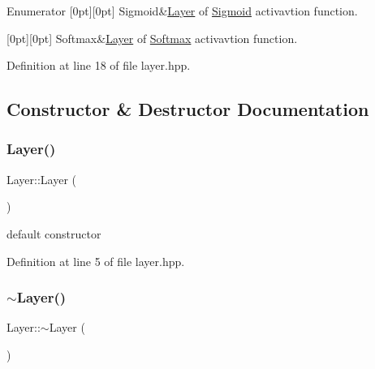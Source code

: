 \begin{DoxyEnumFields}{Enumerator}
[0pt][0pt]{}\mbox{\label{class_layer_a823f18343920cda4f52dce36df6e851fa467cf9e29d4001586b13a922da0dc34b}} 
Sigmoid&\hyperlink{class_layer}{Layer} of \hyperlink{class_sigmoid}{Sigmoid} activavtion function. \\
\hline

[0pt][0pt]{}\mbox{\label{class_layer_a823f18343920cda4f52dce36df6e851fad34b12e05ec54f3885a71b7207b630de}} 
Softmax&\hyperlink{class_layer}{Layer} of \hyperlink{class_softmax}{Softmax} activavtion function. \\
\hline

\end{DoxyEnumFields}


Definition at line 18 of file layer.\+hpp.



\subsection{Constructor \& Destructor Documentation}
\mbox{\label{class_layer_a8f623c7c4737dc29ecc86978d243ac6f}} 
\subsubsection{\texorpdfstring{Layer()}{Layer()}}
{\footnotesize\ttfamily Layer\+::\+Layer (\begin{DoxyParamCaption}{ }\end{DoxyParamCaption})}



default constructor 



Definition at line 5 of file layer.\+hpp.

\mbox{\label{class_layer_a1b1ba4804451dfe6cc357194e42762ae}} 
\subsubsection{\texorpdfstring{$\sim$\+Layer()}{~Layer()}}
{\footnotesize\ttfamily Layer\+::$\sim$\+Layer (\begin{DoxyParamCaption}{ }\end{DoxyParamCaption})\hspace{0.3cm}{\ttfamily [virtual]}}



